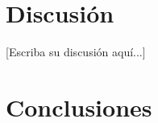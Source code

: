 \documentclass[conference]{IEEEtran}
\begin{document}

\section{Discusión}
%

[Escriba su discusión aquí...]

\section{Conclusiones}
%
\end{document}
